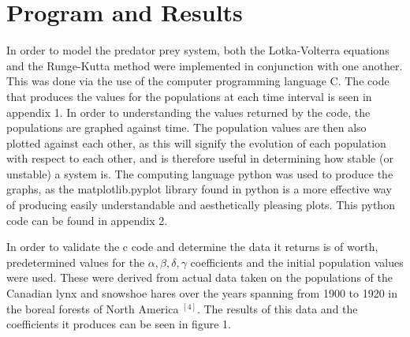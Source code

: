 \documentclass[11pt]{elsarticle}
\begin{document}
\section*{Program and Results}
In order to model the predator prey system, both the Lotka-Volterra equations and the Runge-Kutta method were implemented in conjunction with one another. This was done via the use of the  computer programming language C. The code that produces the values for the populations at each time interval is seen in appendix 1. In order to understanding the values returned by the code, the populations are graphed against time. The population values are then also plotted against each other, as this will signify the evolution of each population with respect to each other, and is therefore useful in determining how stable (or unstable) a system is. The computing language python was used to produce the graphs, as the matplotlib.pyplot library found in python is a more effective way of producing easily understandable and aesthetically pleasing plots. This python code can be found in appendix 2.

In order to validate the c code and determine the data it returns is of worth, predetermined values for the $\alpha,\beta,\delta,\gamma$ coefficients and the initial population values were used. These were derived from actual data taken on the populations of the Canadian lynx and snowshoe hares over the years spanning from 1900 to 1920 in the boreal forests of North America $^{[4]}$. The results of this data and the coefficients it produces can be seen in figure 1.
\end{document}
